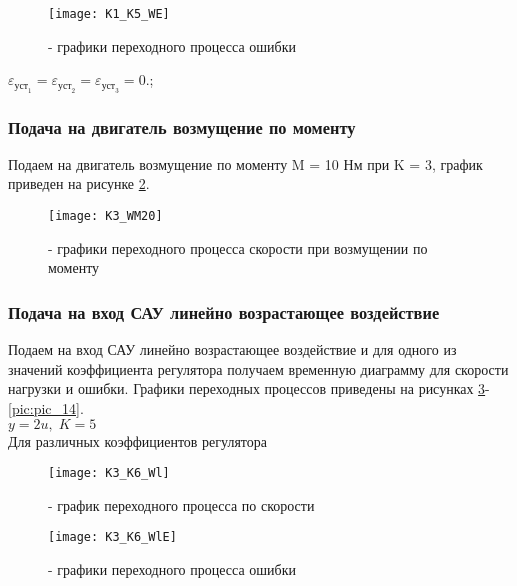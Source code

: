 \begin{figure}[H]
	\begin{center}
		\texttt{[image: K1\_K5\_WE]}
		\caption{- графики переходного процесса ошибки} 
		\label{pic:pic_9} %
	\end{center}
\end{figure}

\begin{center}
$\varepsilon_{\text{уст}_1}=\varepsilon_{\text{уст}_2}=\varepsilon_{\text{уст}_3}=0.$;
\end{center}

\subsubsection{Подача на двигатель возмущение по моменту}
Подаем на двигатель возмущение по моменту M = 10 Нм при K = 3, график приведен на рисунке \ref{pic:pic_10}.
\begin{figure}[H]
	\begin{center}
		\texttt{[image: K3\_WM20]}
		\caption{- графики переходного процесса скорости при возмущении по моменту} 
		\label{pic:pic_10} %
	\end{center}
\end{figure}

\subsubsection{Подача на вход САУ линейно возрастающее воздействие}
Подаем на вход САУ линейно возрастающее воздействие и для одного из значений коэффициента регулятора получаем временную диаграмму для скорости нагрузки и ошибки. Графики переходных процессов приведены на рисунках \ref{pic:pic_11}-\ref{pic:pic_14}.\\
$y=2u,\; K = 5$\\

Для различных коэффициентов регулятора\\
\begin{figure}[H]
	\begin{center}
		\texttt{[image: K3\_K6\_Wl]}
		\caption{- график переходного процесса по скорости} 
		\label{pic:pic_11} %
	\end{center}
\end{figure}

\begin{figure}[H]
	\begin{center}
		\texttt{[image: K3\_K6\_WlE]}
		\caption{- графики переходного процесса ошибки} 
		\label{pic:pic_12} %
	\end{center}
\end{figure}

